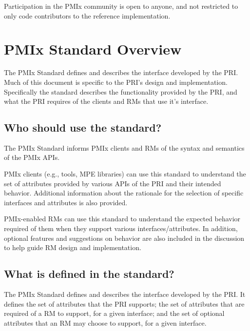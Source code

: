 Participation in the \ac{PMIx} community is open to anyone, and not restricted to only code contributors to the reference implementation.


\section{PMIx Standard Overview}
\label{chap:intro:std_overview}

The \ac{PMIx} Standard defines and describes the interface developed by the \acf{PRI}.
Much of this document is specific to the \acf{PRI}'s design and implementation.
Specifically the standard describes the functionality provided by the \ac{PRI}, and what the \ac{PRI} requires of the clients and \acfp{RM} that use it's interface.

\subsection{Who should use the standard?}

The \ac{PMIx} Standard informs PMIx clients and \acp{RM} of the syntax and semantics of the \ac{PMIx} APIs.

\ac{PMIx} clients (e.g., tools, \ac{MPE} libraries) can use this standard to understand the set of attributes provided by various APIs of the \ac{PRI} and their intended behavior.
Additional information about the rationale for the selection of specific interfaces and attributes is also provided.

\ac{PMIx}-enabled \acp{RM} can use this standard to understand the expected behavior required of them when they support various interfaces/attributes.
In addition, optional features and suggestions on behavior are also included in the discussion to help guide \ac{RM} design and implementation.

\subsection{What is defined in the standard?}

The \ac{PMIx} Standard defines and describes the interface developed by the \acf{PRI}.
It defines the set of attributes that the \ac{PRI} supports; the set of attributes that are required of a \ac{RM} to support, for a given interface; and the set of optional attributes that an \ac{RM} may choose to support, for a given interface.

